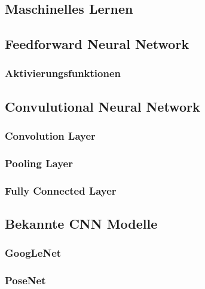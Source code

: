 \subsection{Maschinelles Lernen}
\subsection{Feedforward Neural Network}
\subsubsection{Aktivierungsfunktionen}
\subsection{Convulutional Neural Network}
\subsubsection{Convolution Layer}
\subsubsection{Pooling Layer}
\subsubsection{Fully Connected Layer}
\subsection{Bekannte CNN Modelle}
\subsubsection{GoogLeNet}
\subsubsection{PoseNet}

\pagebreak